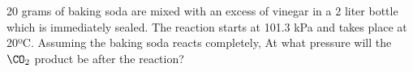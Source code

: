 \documentclass[preview]{standalone}
\begin{document}
\begin{center}
20 grams of baking soda are mixed with an excess of vinegar in a 2 liter bottle which is immediately sealed.  The reaction starts at 101.3 kPa and takes place at 20ºC.  Assuming the baking soda reacts completely, At what pressure will the $\CO_{2}$ product be after the reaction?
\end{center}
\end{document}
